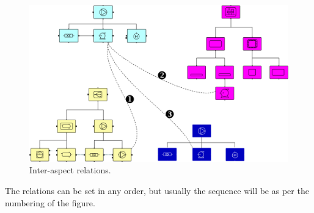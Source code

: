 \documentclass[../main.tex]{subfiles}
\begin{document}
\begin{figure}[htb]
  \centering
  \includegraphics[width=.95\textwidth]{img/IMFmanual-img059.png}
  \caption{Inter-aspect relations.}
  \label{fig:Figure 40}
\end{figure}

The relations can be set in any order, but usually the sequence will be as per the numbering of the figure.
\end{document}
